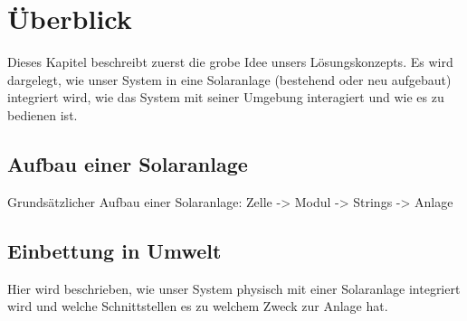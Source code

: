 \chapter{\"Uberblick}
\label{chap:uberblick}
Dieses Kapitel  beschreibt zuerst die grobe  Idee unsers L\"osungskonzepts. Es
wird  dargelegt, wie  unser System  in  eine Solaranlage  (bestehend oder  neu
aufgebaut) integriert wird, wie das System mit seiner Umgebung interagiert und
wie es zu bedienen ist.

\section{Aufbau einer Solaranlage}
\label{sec:solaranlage:aufbau}

Grunds\"atzlicher Aufbau einer Solaranlage: Zelle -> Modul -> Strings -> Anlage

\section{Einbettung in Umwelt}
\label{sec:einbettung}

Hier  wird  beschrieben,  wie  unser System  physisch  mit  einer  Solaranlage
integriert wird und welche Schnittstellen es zu welchem Zweck zur Anlage hat.
